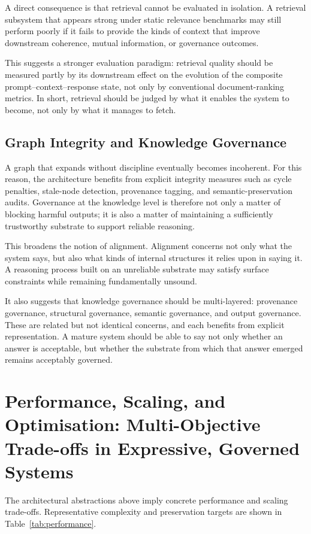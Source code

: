 \documentclass[12pt]{article}
\begin{document}
A direct consequence is that retrieval cannot be evaluated in isolation. A retrieval subsystem that appears strong under static relevance benchmarks may still perform poorly if it fails to provide the kinds of context that improve downstream coherence, mutual information, or governance outcomes.

This suggests a stronger evaluation paradigm: retrieval quality should be measured partly by its downstream effect on the evolution of the composite prompt--context--response state, not only by conventional document-ranking metrics. In short, retrieval should be judged by what it enables the system to become, not only by what it manages to fetch.

\subsection{Graph Integrity and Knowledge Governance}
A graph that expands without discipline eventually becomes incoherent. For this reason, the architecture benefits from explicit integrity measures such as cycle penalties, stale-node detection, provenance tagging, and semantic-preservation audits. Governance at the knowledge level is therefore not only a matter of blocking harmful outputs; it is also a matter of maintaining a sufficiently trustworthy substrate to support reliable reasoning.

This broadens the notion of alignment. Alignment concerns not only what the system says, but also what kinds of internal structures it relies upon in saying it. A reasoning process built on an unreliable substrate may satisfy surface constraints while remaining fundamentally unsound.

It also suggests that knowledge governance should be multi-layered: provenance governance, structural governance, semantic governance, and output governance. These are related but not identical concerns, and each benefits from explicit representation. A mature system should be able to say not only whether an answer is acceptable, but whether the substrate from which that answer emerged remains acceptably governed.

\section{Performance, Scaling, and Optimisation: Multi-Objective Trade-offs in Expressive, Governed Systems}\label{sec:performance}
The architectural abstractions above imply concrete performance and scaling trade-offs. Representative complexity and preservation targets are shown in Table~\ref{tab:performance}.
\end{document}

